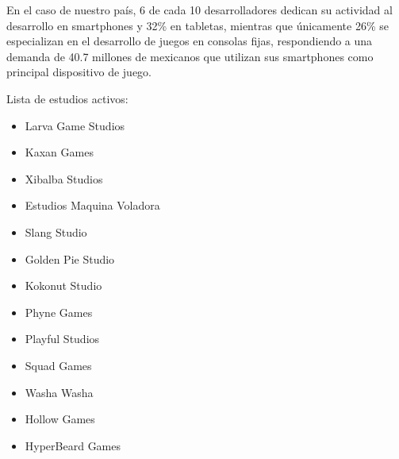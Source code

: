 \documentclass{article}
\begin{document}
En el caso de nuestro país, 6 de cada 10 desarrolladores dedican su actividad al desarrollo en smartphones y 32\% en tabletas, mientras que únicamente 26\% se especializan en el desarrollo de juegos en consolas fijas, respondiendo a una demanda de 40.7 millones de mexicanos que utilizan sus smartphones como principal dispositivo de juego.

Lista de estudios activos:
\begin{itemize}
	\item Larva Game Studios
	\item Kaxan Games
	\item Xibalba Studios
	\item Estudios Maquina Voladora
	\item Slang Studio
	\item Golden Pie Studio
	\item Kokonut Studio
	\item Phyne Games
	\item Playful Studios
	\item Squad Games
	\item Washa Washa
	\item Hollow Games
	\item HyperBeard Games
	
\end{itemize}
			 
\end{document}
